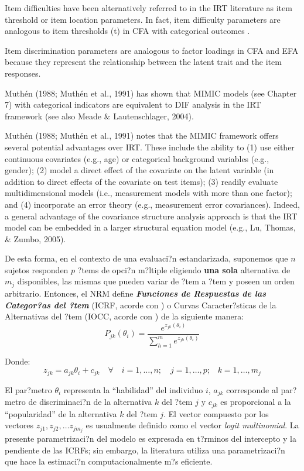Item difficulties have been alternatively referred to in the IRT literature as item threshold or item location parameters. In fact, item difficulty parameters are analogous to item thresholds (t) in CFA with categorical outcomes \citep{Muthen_et_al_1991}.

Item discrimination parameters are analogous to factor loadings in CFA and EFA because they represent the relationship between the latent trait and the item  responses.

Muthén (1988; Muthén et al., 1991) has shown that MIMIC models (see Chapter 7) with categorical indicators are equivalent to DIF analysis in the IRT framework (see also Meade & Lautenschlager, 2004).

Muthén (1988; Muthén et al., 1991) notes that the MIMIC framework offers several potential advantages over IRT. These include the ability to (1) use either continuous covariates (e.g., age) or categorical background  variables (e.g., gender); (2) model a direct effect of the covariate on the latent variable (in addition to direct effects of the covariate on test items); (3) readily  evaluate multidimensional models (i.e., measurement models with more than one factor); and (4) incorporate an error theory (e.g., measurement error covariances). Indeed, a general advantage of the covariance structure analysis approach is that the IRT model can be  embedded in a larger structural equation model (e.g., Lu, Thomas, & Zumbo, 2005).


De esta forma, en el contexto de una evaluaci?n estandarizada, suponemos que $n$ sujetos responden $p$ ?tems de opci?n m?ltiple eligiendo \textbf{una sola} alternativa de $m_j$ disponibles, las mismas que pueden variar de ?tem a ?tem y poseen un orden arbitrario. Entonces, el NRM define \textbf{\textit{Funciones de Respuestas de las Categor?as del ?tem}} (ICRF, acorde con \citealp{Ostini2006}) o Curvas Caracter?sticas de la Alternativas del ?tem (IOCC, acorde con \citealp{Ham_Swam1991}) de la siguiente manera:
\begin{equation}
	P_{jk}(\theta_i) = \dfrac{e^{z_{jk}(\theta_i)}}{\sum_{h=1}^{m}e^{z_{jh}(\theta_i)}} 
\end{equation}

Donde:
\begin{equation*}
z_{jk} = a_{jk}\theta_i + c_{jk} \quad \forall \quad i = 1, \dots, n; \quad j = 1, \dots, p \text{;} \quad k = 1, \dots, m_j
\end{equation*}

El par?metro $\theta_i$ representa la ``habilidad'' del individuo $i$, $a_{jk}$ corresponde al par?metro de discriminaci?n de la alternativa $k$ del ?tem $j$ y $c_{jk}$ es proporcional a la ``popularidad'' de la alternativa $k$ del ?tem $j$. El vector compuesto por los vectores $z_{j1}, z_{j2}, \dots z_{j m_j}$ es usualmente definido como el vector \textit{logit multinomial}. La presente parametrizaci?n del modelo es expresada en t?rminos del intercepto y la pendiente de las ICRFs; sin embargo, la literatura utiliza una parametrizaci?n que hace la estimaci?n computacionalmente m?s eficiente.



